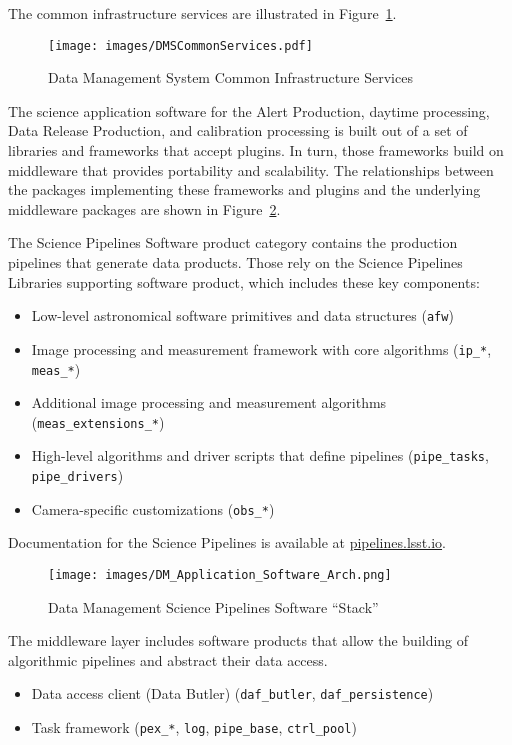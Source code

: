 \documentclass[DM,toc,lsstdraft]{lsstdoc}
\begin{document}
The common infrastructure services are illustrated in Figure~\ref{fig:commonservices}.

\begin{figure}
\centering
\texttt{[image: images/DMSCommonServices.pdf]}
\caption{Data Management System Common Infrastructure Services}
\label{fig:commonservices}
\end{figure}

The science application software for the Alert Production, daytime
processing, Data Release Production, and calibration processing is built
out of a set of libraries and frameworks that accept plugins. In turn, those
frameworks build on middleware that provides portability and
scalability.  The relationships between the packages implementing
these frameworks and plugins and the underlying middleware packages
are shown in Figure~\ref{fig:scipi}.

The Science Pipelines Software product category contains the production pipelines that generate data products.
Those rely on the Science Pipelines Libraries supporting software product, which includes these key components:
\begin{itemize}
\item
  Low-level astronomical software primitives and data structures
  (\texttt{afw})
\item
  Image processing and measurement framework with core algorithms
  (\texttt{ip\_*}, \texttt{meas\_*})
\item
  Additional image processing and measurement algorithms
  (\texttt{meas\_extensions\_*})
\item
  High-level algorithms and driver scripts that define pipelines
  (\texttt{pipe\_tasks}, \texttt{pipe\_drivers})
\item
  Camera-specific customizations (\texttt{obs\_*})
\end{itemize}
Documentation for the Science Pipelines is available at \href{https://pipelines.lsst.io/}{pipelines.lsst.io}.

\begin{figure}
\centering
\texttt{[image: images/DM\_Application\_Software\_Arch.png]}
\caption{Data Management Science Pipelines Software ``Stack''}
\label{fig:scipi}
\end{figure}

The middleware layer includes software products that allow the building of algorithmic pipelines and abstract their data access.
\begin{itemize}
\item
  Data access client (Data Butler) (\texttt{daf\_butler}, \texttt{daf\_persistence})
\item
  Task framework (\texttt{pex\_*}, \texttt{log}, \texttt{pipe\_base}, \texttt{ctrl\_pool})
\end{itemize}
\end{document}
